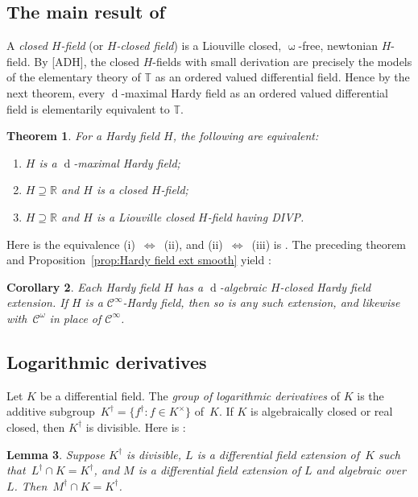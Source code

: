 \documentclass[]{amsart}
\numberwithin{equation}{section}
\newcommand{\bbold}{\mathbb}
\def\R { {\bbold R} }
\def\T { {\bbold T} }
\def \d{\operatorname{d}}
\newtheorem{theorem}{Theorem}[section]
\newtheorem{lemma}[theorem]{Lemma}
\newtheorem{cor}[theorem]{Corollary}
\theoremstyle{definition}
\theoremstyle{remark}
\def \upo{\upomega}
\def \Ginf{\mathcal{C}^{\infty}}
\def \Gom{\mathcal{C}^{\omega}}
\begin{document}
\subsection*{The main result of \cite{ADH2}} 
A {\it closed $H$-field}\/ (or {\it $H$-closed field}\/) is a Liouville closed, $\upo$-free,   newtonian $H$-field. 
By [ADH], the closed $H$-fields with small derivation are precisely the models of the elementary theory of $\T$ as an ordered valued differential field.
Hence by the next theorem, every $\d$-maximal Hardy field as an ordered valued differential field is elementarily equivalent to $\T$. 

\begin{theorem}\label{thm:maxhardymainthm}
For a Hardy field $H$, the following are equivalent:
\begin{enumerate}
\item[\textup{(i)}] $H$ is a $\d$-maximal Hardy field;
\item[\textup{(ii)}] $H\supseteq \R$ and $H$ is a closed $H$-field;
\item[\textup{(iii)}] $H\supseteq \R$ and $H$ is a Liouville closed $H$-field having \textup{DIVP}.
\end{enumerate}
\end{theorem}

\noindent
Here \cite[Theorem~11.19]{ADH2} is the equivalence (i)~$\Leftrightarrow$~(ii), and (ii)~$\Leftrightarrow$~(iii) is \cite[Corollary~1.7]{ADHip}.
The preceding theorem and Proposition~\ref{prop:Hardy field ext smooth} yield \cite[Corollary~11.20]{ADH2}:

\begin{cor}\label{thm:extend to H-closed}
Each Hardy field $H$ has a $\d$-algebraic $H$-closed Hardy field extension.
If $H$ is a $\Ginf$-Hardy field, then so is any such extension, and likewise with~$\Gom$ in place of $\Ginf$.
\end{cor}





\subsection*{Logarithmic derivatives}
Let $K$ be a differential field. 
The {\it group of logarithmic derivatives}\/ of $K$ is the additive subgroup~$K^\dagger=\{f^\dagger:f\in K^\times\}$  of~$K$.
If $K$ is algebraically closed or real closed, then $K^\dagger$ is divisible.
Here is  \cite[Lemma~1.2.1]{ADH4}:

\begin{lemma}\label{lem:Kdagger alg closure}
Suppose $K^\dagger$ is divisible,  $L$ is a differential field extension of~$K$ such that~${L^\dagger\cap K=K^\dagger}$, and
$M$ is a differential field extension of $L$ and algebraic over~$L$. Then~$M^\dagger\cap K=K^\dagger$.
\end{lemma}
\end{document}
